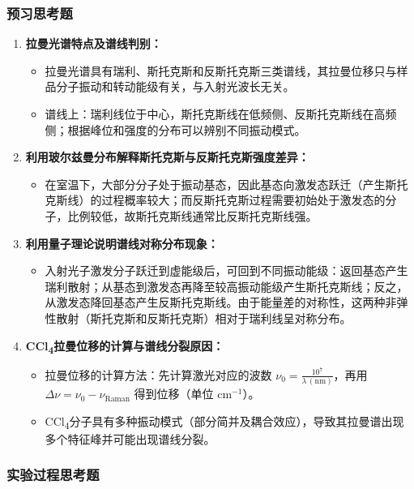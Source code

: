 \documentclass[12pt,a4paper,UTF8]{ctexart}
\begin{document}
\subsubsection*{预习思考题}
\begin{enumerate}
	\item \textbf{拉曼光谱特点及谱线判别：}
	\begin{itemize}
	  \item 拉曼光谱具有瑞利、斯托克斯和反斯托克斯三类谱线，其拉曼位移只与样品分子振动和转动能级有关，与入射光波长无关。
	  \item 谱线上：瑞利线位于中心，斯托克斯线在低频侧、反斯托克斯线在高频侧；根据峰位和强度的分布可以辨别不同振动模式。
	\end{itemize}
  
	\item \textbf{利用玻尔兹曼分布解释斯托克斯与反斯托克斯强度差异：}
	\begin{itemize}
	  \item 在室温下，大部分分子处于振动基态，因此基态向激发态跃迁（产生斯托克斯线）的过程概率较大；而反斯托克斯过程需要初始处于激发态的分子，比例较低，故斯托克斯线通常比反斯托克斯线强。
	\end{itemize}
  
	\item \textbf{利用量子理论说明谱线对称分布现象：}
	\begin{itemize}
	  \item 入射光子激发分子跃迁到虚能级后，可回到不同振动能级：返回基态产生瑞利散射；从基态到激发态再降至较高振动能级产生斯托克斯线；反之，从激发态降回基态产生反斯托克斯线。由于能量差的对称性，这两种非弹性散射（斯托克斯和反斯托克斯）相对于瑞利线呈对称分布。
	\end{itemize}
  
	\item \textbf{CCl\textsubscript{4}拉曼位移的计算与谱线分裂原因：}
	\begin{itemize}
	  \item 拉曼位移的计算方法：先计算激光对应的波数 $\nu_0=\frac{10^7}{\lambda\,(\text{nm})}$，再用 $\Delta\nu=\nu_0-\nu_{\text{Raman}}$ 得到位移（单位 cm$^{-1}$）。
	  \item CCl\textsubscript{4}分子具有多种振动模式（部分简并及耦合效应），导致其拉曼谱出现多个特征峰并可能出现谱线分裂。
	\end{itemize}
\end{enumerate}

\subsubsection*{实验过程思考题}
  
\end{document}
